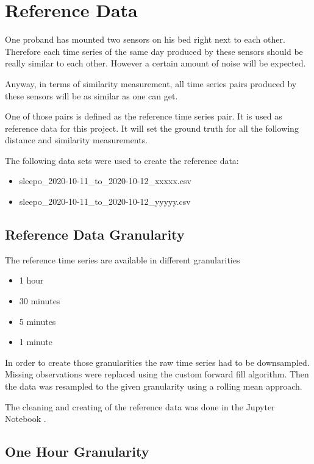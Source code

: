 \chapter{Reference Data}

One proband has mounted two sensors on his bed right next to each other. Therefore each time series of the same day produced by these sensors should be really similar to each other. However a certain amount of noise will be expected. 

Anyway, in terms of similarity measurement, all time series pairs produced by these sensors will be as similar as one can get.

One of those pairs is defined as the reference time series pair. It is used as reference data for this project. It will set the ground truth for all the following distance and similarity measurements.

The following data sets were used to create the reference data:

\begin{itemize}
  \item sleepo\_2020-10-11\_to\_2020-10-12\_xxxxx.csv
  \item sleepo\_2020-10-11\_to\_2020-10-12\_yyyyy.csv
\end{itemize}



\section{Reference Data Granularity}
The reference time series are available in different granularities

\begin{itemize}
  \item 1 hour
  \item 30 minutes
  \item 5 minutes
  \item 1 minute
\end{itemize}

In order to create those granularities the raw time series had to be downsampled.
Missing observations were replaced using the custom forward fill algorithm. Then the data was resampled to the given granularity using a rolling mean approach.

The cleaning and creating of the reference data was done in the Jupyter Notebook 
\newline {}.


\section{One Hour Granularity}

